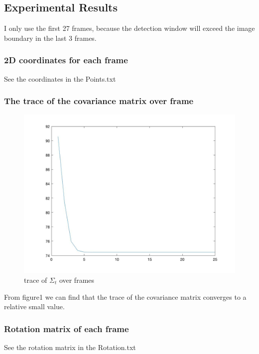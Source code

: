 \documentclass{article}
\begin{document}
\subsection*{Experimental Results}
\par
I only use the first 27 frames, because the detection window will exceed the image boundary in the last 3 frames.
\subsubsection*{2D coordinates for each frame}
\par 
See the coordinates in the Points.txt
\subsubsection*{The trace of the covariance matrix over frame}
\par
\begin{figure}[H]
\centering
\includegraphics[scale=0.3]{trace.jpg}
\caption{trace of $\Sigma_t$ over frames}
\label{fig:label}
\end{figure}
From figure1 we can find that the trace of the covariance matrix converges to a relative small value.
\subsubsection*{Rotation matrix of each frame}
\par
See the rotation matrix in the Rotation.txt
\end{document}
